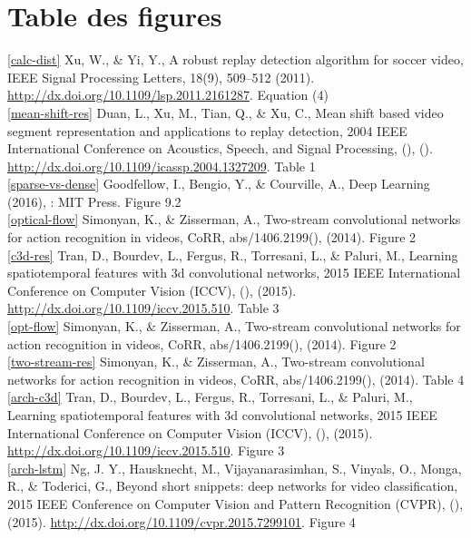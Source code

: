\documentclass[11pt]{article}
\begin{document}
\newpage
\section{Table des figures}
\label{sec:orgfae6e70}
\ref{calc-dist} Xu, W., \& Yi, Y., A robust replay detection algorithm for soccer video, IEEE Signal Processing Letters, 18(9), 509–512 (2011).  \url{http://dx.doi.org/10.1109/lsp.2011.2161287}. Equation (4)\\

\ref{mean-shift-res} Duan, L., Xu, M., Tian, Q., \& Xu, C., Mean shift based video segment representation and applications to replay detection, 2004 IEEE International Conference on Acoustics, Speech, and Signal Processing, (),  ().  \url{http://dx.doi.org/10.1109/icassp.2004.1327209}. Table 1\\

\ref{sparse-vs-dense} Goodfellow, I., Bengio, Y., \& Courville, A., Deep Learning (2016), : MIT Press. \cite{Goodfellow-et-al-2016} Figure 9.2\\

\ref{optical-flow} Simonyan, K., \& Zisserman, A., Two-stream convolutional networks for action recognition in videos, CoRR, abs/1406.2199(),  (2014). Figure 2\\

\ref{c3d-res} Tran, D., Bourdev, L., Fergus, R., Torresani, L., \& Paluri, M., Learning spatiotemporal features with 3d convolutional networks, 2015 IEEE International Conference on Computer Vision (ICCV), (),  (2015).  \url{http://dx.doi.org/10.1109/iccv.2015.510}. Table 3\\

\ref{opt-flow} Simonyan, K., \& Zisserman, A., Two-stream convolutional networks for action recognition in videos, CoRR, abs/1406.2199(),  (2014). Figure 2\\

\ref{two-stream-res} Simonyan, K., \& Zisserman, A., Two-stream convolutional networks for action recognition in videos, CoRR, abs/1406.2199(),  (2014). Table 4\\

\ref{arch-c3d} Tran, D., Bourdev, L., Fergus, R., Torresani, L., \& Paluri, M., Learning spatiotemporal features with 3d convolutional networks, 2015 IEEE International Conference on Computer Vision (ICCV), (),  (2015).  \url{http://dx.doi.org/10.1109/iccv.2015.510}. Figure 3\\

\ref{arch-lstm} Ng, J. Y., Hausknecht, M., Vijayanarasimhan, S., Vinyals, O., Monga, R., \& Toderici, G., Beyond short snippets: deep networks for video classification, 2015 IEEE Conference on Computer Vision and Pattern Recognition (CVPR), (),  (2015).  \url{http://dx.doi.org/10.1109/cvpr.2015.7299101}. Figure 4\\
\end{document}
